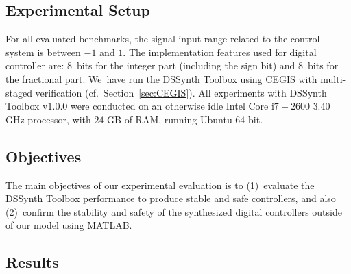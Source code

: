 \documentclass[10pt,conference]{IEEEtran}
\newcommand\tool{{DSSynth Toolbox}\xspace}
\begin{document}

\subsection{Experimental Setup}
\label{experimental-setup}

For all evaluated benchmarks, the signal input range related to the control
system is between $-1$ and $1$.  The implementation features used for
digital controller are: $8$~bits for the integer part (including the sign
bit) and $8$~bits for the fractional part.  We~have run the \tool using
CEGIS with multi-staged verification (cf.~Section~\ref{sec:CEGIS}).  All
experiments with \tool v$1$.$0$.$0$ were conducted on an otherwise idle
Intel Core i$7-2600$ $3.40$ GHz processor, with $24$ GB of RAM, running
Ubuntu $64$-bit.

\subsection{Objectives}

The main objectives of our experimental evaluation is to (1)~evaluate the
\tool performance to produce stable and safe controllers, and also
(2)~confirm the stability and safety of the synthesized digital controllers
outside of our model using MATLAB.


\subsection{Results}
\end{document}
